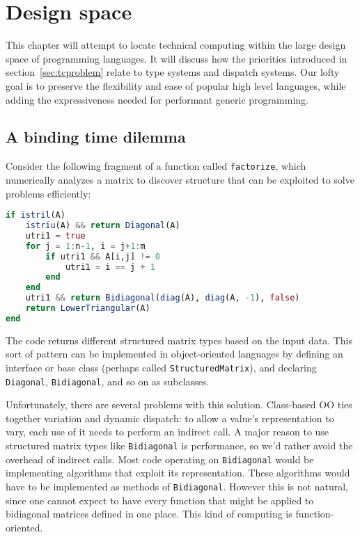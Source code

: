 \chapter{Design space}


This chapter will attempt to locate technical computing within the large
design space of programming languages.
It will discuss how the priorities introduced in section~\ref{sec:tcproblem}
relate to type systems and dispatch systems.
Our lofty goal is to preserve the flexibility and ease of popular high level
languages, while adding the expressiveness needed for performant generic
programming.


\section{A binding time dilemma}
\label{sec:bindingtimedilemma}

Consider the following fragment of a function called \texttt{factorize},
which numerically analyzes a matrix to discover structure that
can be exploited to solve problems efficiently:

\begin{singlespace}
\begin{lstlisting}[language=julia]
if istril(A)
    istriu(A) && return Diagonal(A)
    utri1 = true
    for j = 1:n-1, i = j+1:m
        if utri1 && A[i,j] != 0
            utri1 = i == j + 1
        end
    end
    utri1 && return Bidiagonal(diag(A), diag(A, -1), false)
    return LowerTriangular(A)
end
\end{lstlisting}
\end{singlespace}

\noindent
The code returns different structured matrix types based on the input
data.
This sort of pattern can be implemented in object-oriented languages
by defining an interface or base class (perhaps called \texttt{StructuredMatrix}),
and declaring \texttt{Diagonal}, \texttt{Bidiagonal}, and so on as
subclasses.

Unfortunately, there are several problems with this solution.
Class-based OO ties together variation and dynamic dispatch: to allow
a value's representation to vary, each use of it needs to perform an
indirect call.
A major reason to use structured matrix types like \texttt{Bidiagonal}
is performance, so we'd rather avoid the overhead of indirect calls.
Most code operating on \texttt{Bidiagonal} would
be implementing algorithms that exploit its representation.
These algorithms would have to be implemented as methods of
\texttt{Bidiagonal}.
However this is not natural, since one cannot expect to have every
function that might be applied to bidiagonal matrices defined in
one place.
This kind of computing is function-oriented.

